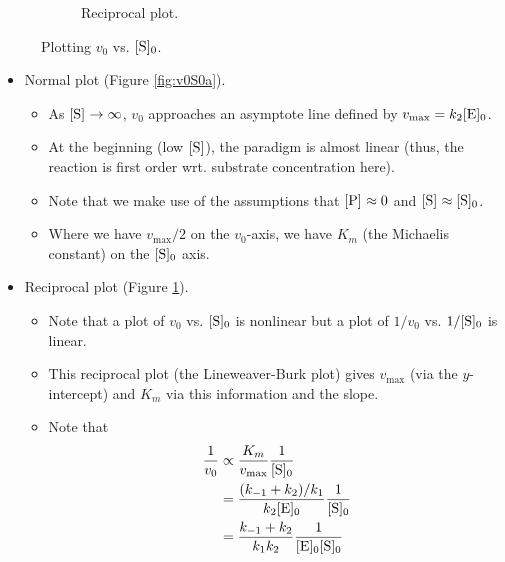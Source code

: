 \documentclass[../notes.tex]{subfiles}
\begin{document}
\begin{itemize}
\begin{figure}[h!]
\begin{subfigure}[b]{0.45\linewidth}
            \caption{Reciprocal plot.}
            \label{fig:v0S0b}
        \end{subfigure}
        \caption{Plotting $v_0$ vs. $\cnc[0]{S}$.}
        \label{fig:v0S0}
    \end{figure}
    \begin{itemize}
        \item Normal plot (Figure \ref{fig:v0S0a}).
        \begin{itemize}
            \item As $\cnc{S}\to\infty$, $v_0$ approaches an asymptote line defined by $v_\text{max}=k_2\cnc[0]{E}$.
            \item At the beginning (low $\cnc{S}$), the paradigm is almost linear (thus, the reaction is first order wrt. substrate concentration here).
            \item Note that we make use of the assumptions that $\cnc{P}\approx 0$ and $\cnc{S}\approx\cnc[0]{S}$.
            \item Where we have $v_\text{max}/2$ on the $v_0$-axis, we have $K_m$ (the Michaelis constant) on the $\cnc[0]{S}$ axis.
        \end{itemize}
        \item Reciprocal plot (Figure \ref{fig:v0S0b}).
        \begin{itemize}
            \item Note that a plot of $v_0$ vs. $\cnc[0]{S}$ is nonlinear but a plot of $1/v_0$ vs. $1/\cnc[0]{S}$ is linear.
            \item This reciprocal plot (the Lineweaver-Burk plot) gives $v_\text{max}$ (via the $y$-intercept) and $K_m$ via this information and the slope.
            \item Note that
            \begin{align*}
                \frac{1}{v_0} &\propto \frac{K_m}{v_\text{max}}\frac{1}{\cnc[0]{S}}\\
                &= \frac{(k_{-1}+k_2)/k_1}{k_2\cnc[0]{E}}\frac{1}{\cnc[0]{S}}\\
                &= \frac{k_{-1}+k_2}{k_1k_2}\frac{1}{\cnc[0]{E}\cnc[0]{S}}
            \end{align*}
        \end{itemize}

\end{itemize}
\end{itemize}
\end{document}
